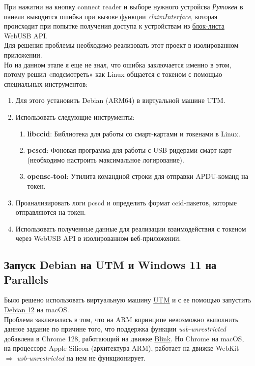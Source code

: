 \documentclass[12pt]{article}
\begin{document}
При нажатии на кнопку connect reader и выборе нужного устройсва \emph{Рутокен} в панели выводится ошибка при вызове функции \emph{claimInterface}, которая происходит при попытке получения доступа к устройствам из \href{https://groups.google.com/a/chromium.org/g/blink-dev/c/LZXocaeCwDw/m/GLfAffGLAAAJ}{{блок-листа}} WebUSB API. \\
Для решения проблемы необходимо реализовать этот проект в изолированном приложении. \\

Но на данном этапе я еще не знал, что ошибка заключается именно в этом, потому решил «подсмотреть» как Linux общается с токеном с помощью специальных инструментов: \\
\begin{enumerate} 
    \item Для этого установить  Debian  (ARM64)  в  виртуальной машине UTM.
    \item Использовать  следующие  инструменты:
    \begin{enumerate}
 	      \item \textbf{libccid}: Библиотека  для  работы  со  смарт-картами  и  токенами  в  Linux.
     	  \item \textbf{pcscd}: Фоновая программа  для  работы  с  USB-ридерами  смарт-карт  (необходимо  настроить  максимальное  логирование).
     	  \item \textbf{opensc-tool}: Утилита  командной  строки  для  отправки  APDU-команд  на  токен. 
    \end{enumerate}
    \item Проанализировать  логи  pcscd  и  определить  формат  ccid-пакетов,  которые  отправляются  на  токен. 
    \item Использовать  полученные  данные  для  реализации  взаимодействия  с токеном через WebUSB API в изолированном веб-приложении. 
\end{enumerate} 

\subsection{Запуск Debian на UTM и Windows 11 на Parallels}
Было решено использовать виртуальную машину \href{https://mac.getutm.app}{{UTM}} и с ее помощью запустить \href{https://mac.getutm.app/gallery/debian-12}{{Debian 12}} на macOS. \\
Проблема заключалась в том, что на ARM впринципе невозможно выполнить данное задание по причине того, что поддержка функции \emph{usb-unrestricted} добавлена в Chrome 128, работающий на движке \href{https://www.chromium.org/blink/}{{Blink}}. Но Chrome на macOS, на процессоре Apple Silicon (архитектура ARM), работает на движке WebKit $\Rightarrow$ \emph{usb-unrestricted} на нем не функционирует. 
\end{document}
